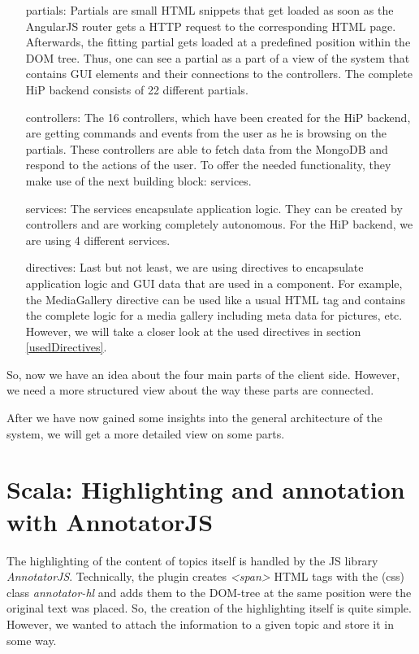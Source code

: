 \begin{itemize}
	\item[partials:] Partials are small \ac{HTML} snippets that get loaded as soon as the AngularJS router gets a \ac{HTTP} request to the corresponding \ac{HTML} page. Afterwards, the fitting partial gets loaded at a predefined position within the \ac{DOM} tree. Thus, one can see a partial as a part of a view of the system that contains \ac{GUI} elements and their connections to the controllers.  The complete \ac{HiP} backend consists of 22 different partials.  
	\item[controllers:] The 16 controllers, which have been created for the \ac{HiP} backend, are getting commands and events from the user as he is browsing on the partials. These controllers are able to fetch data from the MongoDB and respond to the actions of the user. To offer the needed functionality, they make use of the next building block: services.  
	\item[services:] The services encapsulate application logic. They can be created by controllers and are working completely autonomous. For the \ac{HiP} backend, we are using 4 different services.
	\item[directives:] Last but not least, we are using directives to encapsulate application logic and \ac{GUI} data that are used in a component. For example, the MediaGallery directive can be used like a usual \ac{HTML} tag and contains the complete logic for a media gallery including meta data for pictures, etc. However, we will take a closer look at the used directives in section \ref{usedDirectives}.
\end{itemize}

So, now we have an idea about the four main parts of the client side. However, we need a more structured view about the way these parts are connected.

After we have now gained some insights into the general architecture of the system, we will get a more detailed view on some parts.

\section{Scala: Highlighting and annotation with AnnotatorJS}
The highlighting of the content of topics itself is handled by the \ac{JS} library \emph{AnnotatorJS}. Technically, the plugin creates \emph{<span>} \ac{HTML} tags with the (css) class \emph{annotator-hl} and adds them to the \ac{DOM}-tree at the same position were the original text was placed. So, the creation of the highlighting itself is quite simple. However, we wanted to attach the information to a given topic and store it in some way.  

